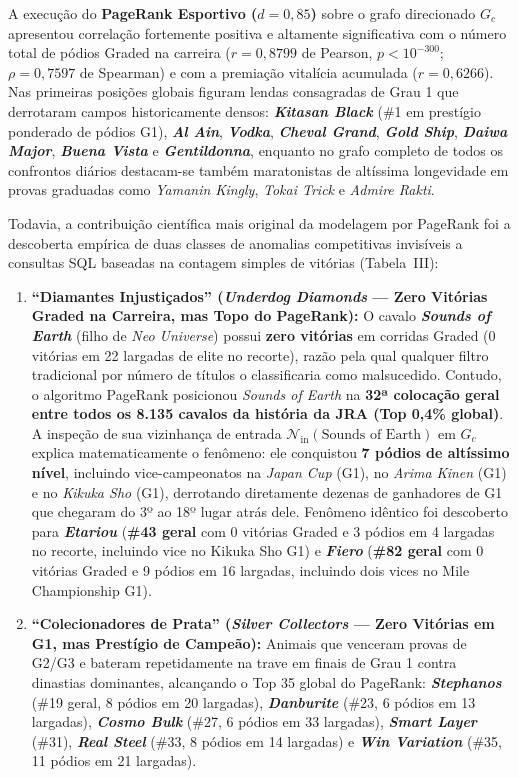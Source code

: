 \documentclass[conference]{IEEEtran}
\begin{document}
A execução do \textbf{PageRank Esportivo ($d = 0,85$)} sobre o grafo direcionado $G_c$ apresentou correlação fortemente positiva e altamente significativa com o número total de pódios Graded na carreira ($r = 0,8799$ de Pearson, $p < 10^{-300}$; $\rho = 0,7597$ de Spearman) e com a premiação vitalícia acumulada ($r = 0,6266$). Nas primeiras posições globais figuram lendas consagradas de Grau 1 que derrotaram campos historicamente densos: \textbf{\textit{Kitasan Black}} (\#1 em prestígio ponderado de pódios G1), \textbf{\textit{Al Ain}}, \textbf{\textit{Vodka}}, \textbf{\textit{Cheval Grand}}, \textbf{\textit{Gold Ship}}, \textbf{\textit{Daiwa Major}}, \textbf{\textit{Buena Vista}} e \textbf{\textit{Gentildonna}}, enquanto no grafo completo de todos os confrontos diários destacam-se também maratonistas de altíssima longevidade em provas graduadas como \textit{Yamanin Kingly}, \textit{Tokai Trick} e \textit{Admire Rakti}.

Todavia, a contribuição científica mais original da modelagem por PageRank foi a descoberta empírica de duas classes de anomalias competitivas invisíveis a consultas SQL baseadas na contagem simples de vitórias (Tabela~III):
\begin{enumerate}
    \item \textbf{``Diamantes Injustiçados'' (\textit{Underdog Diamonds} --- Zero Vitórias Graded na Carreira, mas Topo do PageRank):} O cavalo \textbf{\textit{Sounds of Earth}} (filho de \textit{Neo Universe}) possui \textbf{zero vitórias} em corridas Graded (0 vitórias em 22 largadas de elite no recorte), razão pela qual qualquer filtro tradicional por número de títulos o classificaria como malsucedido. Contudo, o algoritmo PageRank posicionou \textit{Sounds of Earth} na \textbf{32ª colocação geral entre todos os 8.135 cavalos da história da JRA (Top 0,4\%
global)}. A inspeção de sua vizinhança de entrada $\mathcal{N}_{\text{in}}(\text{Sounds of Earth})$ em $G_c$ explica matematicamente o fenômeno: ele conquistou \textbf{7 pódios de altíssimo nível}, incluindo vice-campeonatos na \textit{Japan Cup} (G1), no \textit{Arima Kinen} (G1) e no \textit{Kikuka Sho} (G1), derrotando diretamente dezenas de ganhadores de G1 que chegaram do 3º ao 18º lugar atrás dele. Fenômeno idêntico foi descoberto para \textbf{\textit{Etariou}} (\textbf{\#43 geral} com 0 vitórias Graded e 3 pódios em 4 largadas no recorte, incluindo vice no Kikuka Sho G1) e \textbf{\textit{Fiero}} (\textbf{\#82 geral} com 0 vitórias Graded e 9 pódios em 16 largadas, incluindo dois vices no Mile Championship G1).
    \item \textbf{``Colecionadores de Prata'' (\textit{Silver Collectors} --- Zero Vitórias em G1, mas Prestígio de Campeão):} Animais que venceram provas de G2/G3 e bateram repetidamente na trave em finais de Grau 1 contra dinastias dominantes, alcançando o Top 35 global do PageRank: \textbf{\textit{Stephanos}} (\#19 geral, 8 pódios em 20 largadas), \textbf{\textit{Danburite}} (\#23, 6 pódios em 13 largadas), \textbf{\textit{Cosmo Bulk}} (\#27, 6 pódios em 33 largadas), \textbf{\textit{Smart Layer}} (\#31), \textbf{\textit{Real Steel}} (\#33, 8 pódios em 14 largadas) e \textbf{\textit{Win Variation}} (\#35, 11 pódios em 21 largadas).
\end{enumerate}
\end{document}
